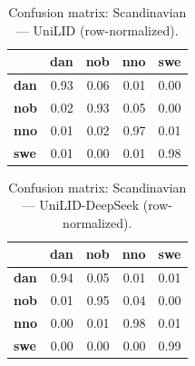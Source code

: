 \begin{table}[htbp]
\centering
\small
\begin{tabular}{lrrrr}
\toprule
 & \textbf{dan} & \textbf{nob} & \textbf{nno} & \textbf{swe} \\
\midrule
\textbf{dan} & \cellcolor{blue!92}\color{white}0.93 & \cellcolor{blue!5}0.06 & \cellcolor{blue!1}0.01 & \cellcolor{blue!0}0.00 \\
\textbf{nob} & \cellcolor{blue!1}0.02 & \cellcolor{blue!93}\color{white}0.93 & \cellcolor{blue!5}0.05 & \cellcolor{blue!0}0.00 \\
\textbf{nno} & \cellcolor{blue!0}0.01 & \cellcolor{blue!1}0.02 & \cellcolor{blue!96}\color{white}0.97 & \cellcolor{blue!0}0.01 \\
\textbf{swe} & \cellcolor{blue!0}0.01 & \cellcolor{blue!0}0.00 & \cellcolor{blue!0}0.01 & \cellcolor{blue!98}\color{white}0.98 \\
\bottomrule
\end{tabular}
\caption{Confusion matrix: Scandinavian — UniLID (row-normalized).}
\label{tab:cm-scandinavian-unilid}
\end{table}

\begin{table}[htbp]
\centering
\small
\begin{tabular}{lrrrr}
\toprule
 & \textbf{dan} & \textbf{nob} & \textbf{nno} & \textbf{swe} \\
\midrule
\textbf{dan} & \cellcolor{blue!94}\color{white}0.94 & \cellcolor{blue!4}0.05 & \cellcolor{blue!0}0.01 & \cellcolor{blue!0}0.01 \\
\textbf{nob} & \cellcolor{blue!0}0.01 & \cellcolor{blue!95}\color{white}0.95 & \cellcolor{blue!3}0.04 & \cellcolor{blue!0}0.00 \\
\textbf{nno} & \cellcolor{blue!0}0.00 & \cellcolor{blue!1}0.01 & \cellcolor{blue!97}\color{white}0.98 & \cellcolor{blue!0}0.01 \\
\textbf{swe} & \cellcolor{blue!0}0.00 & \cellcolor{blue!0}0.00 & \cellcolor{blue!0}0.00 & \cellcolor{blue!99}\color{white}0.99 \\
\bottomrule
\end{tabular}
\caption{Confusion matrix: Scandinavian — UniLID-DeepSeek (row-normalized).}
\label{tab:cm-scandinavian-unilid-deepseek}
\end{table}

